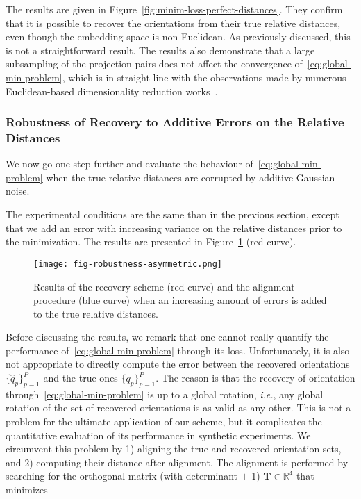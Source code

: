 The results are given in Figure~\ref{fig:minim-loss-perfect-distances}. They confirm that it is possible to recover the orientations from their true relative distances, even though the embedding space is non-Euclidean. As previously discussed, this is not a straightforward result. The results also demonstrate that a large subsampling of the projection pairs does not affect the convergence of~\eqref{eq:global-min-problem}, which is in straight line with the observations made by numerous Euclidean-based dimensionality reduction works~\cite{belkin2003laplacian,kruskal1978multidimensional, maaten2008visualizing, mcinnes2018umap}.

\subsubsection{Robustness of Recovery to Additive Errors on the Relative Distances}
\label{subsec:5-6-4-robustness-to-errors}

We now go one step further and evaluate the behaviour of~\eqref{eq:global-min-problem} when the true relative distances are corrupted by  additive Gaussian noise.

The experimental conditions are the same than in the previous section, except that we add an error with increasing variance on the relative distances prior to the minimization. The results are presented in Figure~\ref{fig:recovery-noise-distances} (red curve).

\begin{figure}
    \centering
    \texttt{[image: fig-robustness-asymmetric.png]}
    \caption{Results of the recovery scheme (red curve) and the alignment procedure (blue curve) when an increasing amount of errors is added to the true relative distances.}
    \label{fig:recovery-noise-distances}
\end{figure}

Before discussing the results, we remark that one cannot really quantify the performance of~\eqref{eq:global-min-problem} through its loss. Unfortunately, it is also not appropriate to directly compute the error between the recovered orientations $\big\{\widehat{q}_p\big\}_{p=1}^P$ and the true ones $\big\{q_p\big\}_{p=1}^P$. The reason is that the recovery of orientation through~\eqref{eq:global-min-problem} is up to a global rotation, \textit{i.e.}, any global rotation of the set of recovered orientations is as valid as any other. This is not a problem for the ultimate application of our scheme, but it complicates the quantitative evaluation of its performance in synthetic experiments. We circumvent this problem by 1) aligning the true and recovered orientation sets, and 2) computing their distance after alignment. The alignment is performed by searching for the orthogonal matrix (with determinant $\pm$ 1) $\mathbf{T}\in\mathbb{R}^4$  that minimizes

